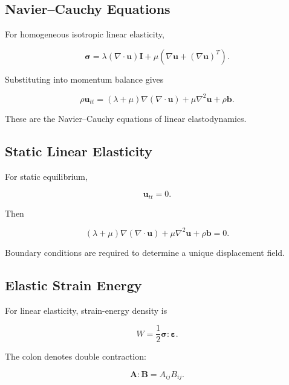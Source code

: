 \subsection{Navier--Cauchy Equations}
\label{subsec:navier-cauchy-equations}

For homogeneous isotropic linear elasticity,

\[
\boldsymbol{\sigma}
=
\lambda
(\nabla\cdot\mathbf{u})
\mathbf{I}
+
\mu
\left(
\nabla\mathbf{u}
+
(\nabla\mathbf{u})^T
\right).
\]

Substituting into momentum balance gives

\[
\boxed{
\rho\mathbf{u}_{tt}
=
(\lambda+\mu)
\nabla(\nabla\cdot\mathbf{u})
+
\mu\nabla^2\mathbf{u}
+
\rho\mathbf{b}.
}
\]

These are the Navier--Cauchy equations of linear elastodynamics.

\subsection{Static Linear Elasticity}
\label{subsec:static-linear-elasticity}

For static equilibrium,

\[
\mathbf{u}_{tt}=0.
\]

Then

\[
\boxed{
(\lambda+\mu)
\nabla(\nabla\cdot\mathbf{u})
+
\mu\nabla^2\mathbf{u}
+
\rho\mathbf{b}
=
0.
}
\]

Boundary conditions are required to determine a unique displacement field.

\subsection{Elastic Strain Energy}
\label{subsec:elastic-strain-energy}

For linear elasticity, strain-energy density is

\[
\boxed{
W
=
\frac12
\boldsymbol{\sigma}
:
\boldsymbol{\varepsilon}.
}
\]

The colon denotes double contraction:

\[
\boxed{
\mathbf{A}:\mathbf{B}
=
A_{ij}B_{ij}.
}
\]

